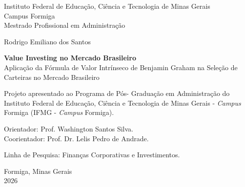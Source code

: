 
\thispagestyle{empty}

\begin{center}
    \small
    \sc Instituto Federal de Educação, Ciência e Tecnologia de Minas Gerais \\ 
    \sc Campus Formiga \\
    \sc Mestrado Profissional em Administração
    
   
    \vspace{3cm}
    \large {Rodrigo Emiliano dos Santos}
    
    \vspace{3cm}
     \large \textbf{Value Investing no Mercado Brasileiro} \\
   Aplicação da Fórmula de Valor Intrínseco de Benjamin Graham na Seleção de Carteiras no Mercado Brasileiro
    
    \vspace{2cm}
    \begin{flushright}
    \begin{minipage}{0.6\textwidth}
    \small
    Projeto apresentado ao Programa de Pós-
    Graduação em Administração do Instituto
    Federal de Educação, Ciência e
    Tecnologia de Minas Gerais - \textit{Campus} Formiga 
    (IFMG - \textit{Campus} Formiga).
    \end{minipage}
    \end{flushright}
    
    \vspace{0.5cm}
    \begin{flushright}
    \small
    Orientador: Prof. Washington Santos Silva.\\
    Coorientador: Prof. Dr. Lelis Pedro de Andrade.
    
    \vspace{0.5cm}
    Linha de Pesquisa: Finanças Corporativas e Investimentos.
    \end{flushright}
    
    \vfill
    Formiga, Minas Gerais \\
    2026
\end{center}


\newpage

\thispagestyle{empty}

\newenvironment{meuresumo}{
  \clearpage
  \small
  \vspace{-1cm}
  \begin{center}
    \bfseries RESUMO
    \vspace{0.5em}
  \end{center}
  \begin{quote}
}{
  \end{quote}
  \vspace{-1.1em}
  \begin{center}
  \begin{minipage}{0.87\textwidth} 
  \textbf{Palavras-chave:} value investing, valor intrínseco, Benjamin Graham.
  \end{minipage}
  \end{center}
  \clearpage
}


